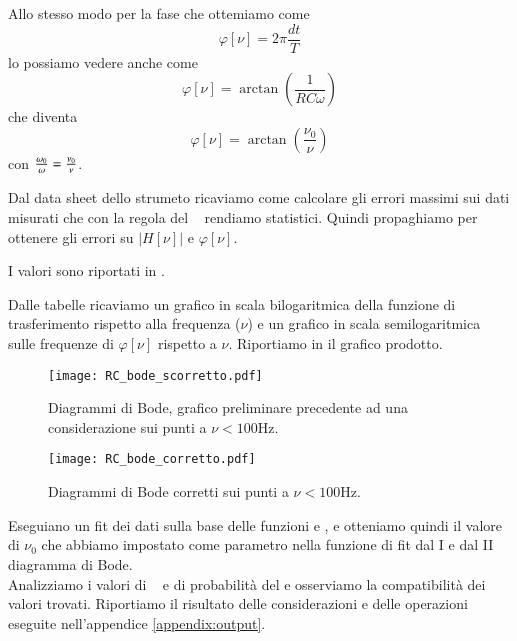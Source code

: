\documentclass[
    rmp,
    reprint, 
    superscriptaddress, 
    altaffilletter, 
    amsmath, 
    amssymb, 
    a4paper]{revtex4-2}
\begin{document}
Allo stesso modo per la fase che ottemiamo come \[\varphi[\nu]=2\pi\frac{dt}{T}\] lo possiamo vedere anche come \[\varphi[\nu]=\arctan\left(\frac{1}{RC\omega}\right)\] che diventa \begin{equation} \varphi[\nu]=\arctan\left(\frac{\nu_0}{\nu}\right) \label{eqn:phi}\end{equation} con ${\omega_0\over\omega} = {\nu_0\over\nu}$.

Dal data sheet dello strumeto ricaviamo come calcolare gli errori massimi sui dati misurati che con la regola del \treSigma~ rendiamo statistici. Quindi propaghiamo per ottenere gli errori su $\left|H[\nu]\right|$ e $\varphi[\nu]$.

I valori sono riportati in .

Dalle tabelle ricaviamo un grafico in scala bilogaritmica della funzione di trasferimento rispetto alla frequenza ($\nu$) e un grafico in scala semilogaritmica sulle frequenze di $\varphi[\nu]$ rispetto a $\nu$. Riportiamo in  il grafico prodotto.

\begin{figure}
    \texttt{[image: RC\_bode\_scorretto.pdf]}
    \caption{Diagrammi di Bode, grafico preliminare precedente ad una considerazione sui punti a $\nu<100$Hz.}
    \label{fig:plot}
\end{figure}
\begin{figure}[t]
    \texttt{[image: RC\_bode\_corretto.pdf]}
    \caption{Diagrammi di Bode corretti sui punti a $\nu<100$Hz.}
    \label{fig:plot_correct}
\end{figure}

Eseguiano un fit dei dati sulla base delle funzioni  e , e otteniamo quindi il valore di $\nu_0$ che abbiamo impostato come parametro nella funzione di fit dal I e dal II diagramma di Bode.\\
Analizziamo i valori di \ChiNdf~ e di probabilità del \ChiSqr e osserviamo la compatibilità dei valori trovati. Riportiamo il risultato delle considerazioni e delle operazioni eseguite nell'appendice \ref{appendix:output}.
\end{document}
